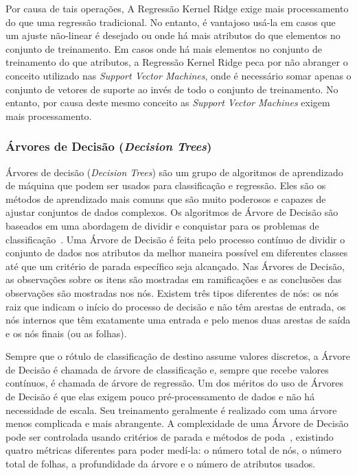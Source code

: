 \documentclass[portugues]{ic-tese}
\begin{document}
Por causa de tais operações, A Regressão Kernel Ridge exige mais processamento do que uma regressão tradicional. No entanto, é vantajoso usá-la em casos que um ajuste não-linear é desejado ou onde há mais atributos do que elementos no conjunto de treinamento. Em casos onde há mais elementos no conjunto de treinamento do que atributos, a Regressão Kernel Ridge peca por não abranger o conceito utilizado nas \textit{Support Vector Machines}, onde é necessário somar apenas o conjunto de vetores de suporte ao invés de todo o conjunto de treinamento. No entanto, por causa deste mesmo conceito as \textit{Support Vector Machines} exigem mais processamento.

\subsubsection{Árvores de Decisão (\textit{Decision Trees})}

Árvores de decisão (\textit{Decision Trees}) são um grupo de algoritmos de aprendizado de máquina que podem ser usados para classificação e regressão. Eles são os métodos de aprendizado mais comuns que são muito poderosos e capazes de ajustar conjuntos de dados complexos. Os algoritmos de Árvore de Decisão são baseados em uma abordagem de dividir e conquistar para os problemas de classificação~\citep{Witten_2016}. Uma Árvore de Decisão é feita pelo processo contínuo de dividir o conjunto de dados nos atributos da melhor maneira possível em diferentes classes até que um critério de parada específico seja alcançado. Nas Árvores de Decisão, as observações sobre os itens são mostradas em ramificações e as conclusões das observações são mostradas nos nós. Existem três tipos diferentes de nós: os nós raiz que indicam o início do processo de decisão e não têm arestas de entrada, os nós internos que têm exatamente uma entrada e pelo menos duas arestas de saída e os nós finais (ou as folhas).

Sempre que o rótulo de classificação de destino assume valores discretos, a Árvore de Decisão é chamada de árvore de classificação e, sempre que recebe valores contínuos, é chamada de árvore de regressão. Um dos méritos do uso de Árvores de Decisão é que elas exigem pouco pré-processamento de dados e não há necessidade de escala. Seu treinamento geralmente é realizado com uma árvore menos complicada e mais abrangente. A complexidade de uma Árvore de Decisão pode ser controlada usando critérios de parada e métodos de poda~\citep{Rokach_2005}, existindo quatro métricas diferentes para poder medí-la: o número total de nós, o número total de folhas, a profundidade da árvore e o número de atributos usados.
\end{document}

